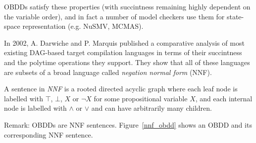 \documentclass[12]{article}
\newenvironment{definition}[1][Definition]{\begin{trivlist}
\item[\hskip \labelsep {\bfseries #1}]}{\end{trivlist}}
\begin{document}
 OBDDs satisfy these properties (with succintness remaining highly dependent on the variable order), and in fact a number of model checkers use them for state-space representation (e.g. NuSMV, MCMAS). 
 
 In 2002, A. Darwiche and P. Marquis published \cite{compilation_map} a comparative analysis of most existing DAG-based target compilation languages in terms of their succintness and the polytime operations they support. They show that all of these languages are subsets of a broad language called \textit{negation normal form} (NNF). 

\begin{definition}
A sentence in \textit{NNF} is a rooted directed acyclic graph where each leaf node is labelled with $\top$, $\bot$, $X$ or $\lnot X$ for some propositional variable $X$, and each internal node is labelled with $\land$ or $\lor$ and can have arbitrarily many children. 

\end{definition} 

\noindent Remark: OBDDs are NNF sentences. Figure~\ref{nnf_obdd} shows an OBDD and its corresponding NNF sentence.  
\end{document}
